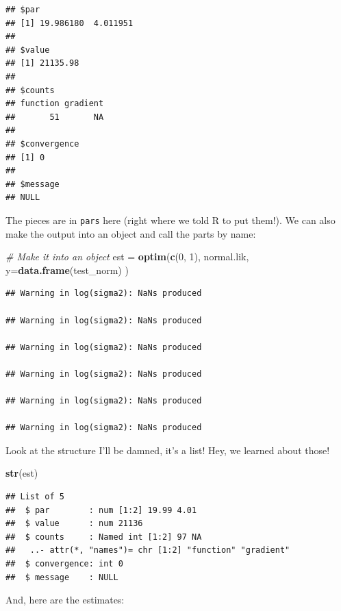 \documentclass[
]{book}
\newenvironment{Shaded}{\begin{snugshade}}{\end{snugshade}}
\newcommand{\CommentTok}[1]{\textcolor[rgb]{0.56,0.35,0.01}{\textit{#1}}}
\newcommand{\DataTypeTok}[1]{\textcolor[rgb]{0.13,0.29,0.53}{#1}}
\newcommand{\DecValTok}[1]{\textcolor[rgb]{0.00,0.00,0.81}{#1}}
\newcommand{\KeywordTok}[1]{\textcolor[rgb]{0.13,0.29,0.53}{\textbf{#1}}}
\newcommand{\NormalTok}[1]{#1}
\newcommand{\OperatorTok}[1]{\textcolor[rgb]{0.81,0.36,0.00}{\textbf{#1}}}
\newcommand{\StringTok}[1]{\textcolor[rgb]{0.31,0.60,0.02}{#1}}
\begin{document}
\begin{verbatim}
## $par
## [1] 19.986180  4.011951
## 
## $value
## [1] 21135.98
## 
## $counts
## function gradient 
##       51       NA 
## 
## $convergence
## [1] 0
## 
## $message
## NULL
\end{verbatim}

The pieces are in \texttt{pars} here (right where we told R to put them!). We can also make the output into an object and call the parts by name:

\begin{Shaded}
\begin{Highlighting}[]
\CommentTok{# Make it into an object}
\NormalTok{est =}\StringTok{ }\KeywordTok{optim}\NormalTok{(}\KeywordTok{c}\NormalTok{(}\DecValTok{0}\NormalTok{, }\DecValTok{1}\NormalTok{),}
\NormalTok{            normal.lik,}
            \DataTypeTok{y=}\KeywordTok{data.frame}\NormalTok{(test_norm)}
\NormalTok{            ) }
\end{Highlighting}
\end{Shaded}

\begin{verbatim}
## Warning in log(sigma2): NaNs produced

## Warning in log(sigma2): NaNs produced

## Warning in log(sigma2): NaNs produced

## Warning in log(sigma2): NaNs produced

## Warning in log(sigma2): NaNs produced

## Warning in log(sigma2): NaNs produced
\end{verbatim}

Look at the structure I'll be damned, it's a list! Hey, we learned about those!

\begin{Shaded}
\begin{Highlighting}[]
\KeywordTok{str}\NormalTok{(est)   }
\end{Highlighting}
\end{Shaded}

\begin{verbatim}
## List of 5
##  $ par        : num [1:2] 19.99 4.01
##  $ value      : num 21136
##  $ counts     : Named int [1:2] 97 NA
##   ..- attr(*, "names")= chr [1:2] "function" "gradient"
##  $ convergence: int 0
##  $ message    : NULL
\end{verbatim}

And, here are the estimates:

\begin{Shaded}
\end{Shaded}
\end{document}
